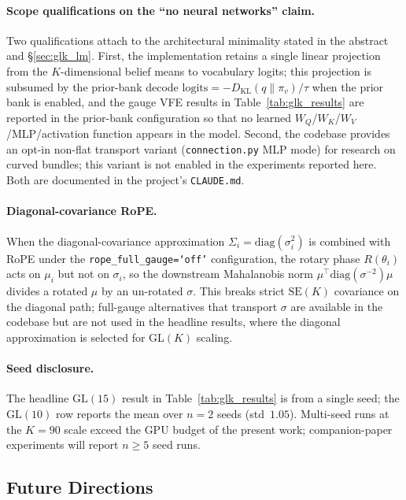 \documentclass[twoside,11pt]{article}
\begin{document}
\paragraph{Scope qualifications on the ``no neural networks'' claim.} Two qualifications attach to the architectural minimality stated in the abstract and §\ref{sec:glk_lm}. First, the implementation retains a single linear projection from the $K$-dimensional belief means to vocabulary logits; this projection is subsumed by the prior-bank decode $\mathrm{logits} = -D_{\mathrm{KL}}(q \| \pi_v)/\tau$ when the prior bank is enabled, and the gauge VFE results in Table~\ref{tab:glk_results} are reported in the prior-bank configuration so that no learned $W_Q$/$W_K$/$W_V$/MLP/activation function appears in the model. Second, the codebase provides an opt-in non-flat transport variant (\texttt{connection.py} MLP mode) for research on curved bundles; this variant is not enabled in the experiments reported here. Both are documented in the project's \texttt{CLAUDE.md}.

\paragraph{Diagonal-covariance RoPE.} When the diagonal-covariance approximation $\Sigma_i = \mathrm{diag}(\sigma_i^2)$ is combined with RoPE under the \texttt{rope\_full\_gauge=\textquoteleft off\textquoteright} configuration, the rotary phase $R(\theta_i)$ acts on $\mu_i$ but not on $\sigma_i$, so the downstream Mahalanobis norm $\mu^\top \mathrm{diag}(\sigma^{-2}) \mu$ divides a rotated $\mu$ by an un-rotated $\sigma$. This breaks strict $\mathrm{SE}(K)$ covariance on the diagonal path; full-gauge alternatives that transport $\sigma$ are available in the codebase but are not used in the headline results, where the diagonal approximation is selected for $\mathrm{GL}(K)$ scaling.

\paragraph{Seed disclosure.} The headline $\mathrm{GL}(15)$ result in Table~\ref{tab:glk_results} is from a single seed; the $\mathrm{GL}(10)$ row reports the mean over $n{=}2$ seeds (std~$1.05$). Multi-seed runs at the $K{=}90$ scale exceed the GPU budget of the present work; companion-paper experiments will report $n \geq 5$ seed runs.

\subsection{Future Directions}
\end{document}
